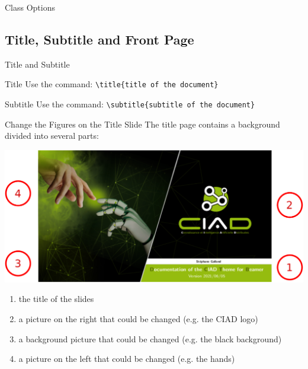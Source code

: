 \documentclass[english,sectioncirclenumberstyle]{ciadbeamer}
\begin{document}
\begin{frame}{Class Options \insertcontinuationtext}
\end{frame}

\subsection{Title, Subtitle and Front Page}

\begin{frame}{Title and Subtitle}
	\begin{block}{Title}
		Use the command: \texttt{{\textbackslash}title\{title of the document\}}
	\end{block}
	\vfill
	\begin{block}{Subtitle}
		Use the command: \texttt{{\textbackslash}subtitle\{subtitle of the document\}}
	\end{block}
	\vfill
\end{frame}

\begin{frame}[t]{{Change the Figures} on the Title Slide}
	The title page contains a background divided into several parts:
	\begin{center}
		\includegraphics[width=.5\linewidth]{frontpage}
	\end{center}
	\begin{enumerate}
		\item the title of the slides
		\item a picture on the right that could be changed (e.g. the CIAD logo)
		\item a background picture that could be changed (e.g. the black background)
		\item a picture on the left that could be changed (e.g. the hands)
	\end{enumerate}
\end{frame}
\end{document}
